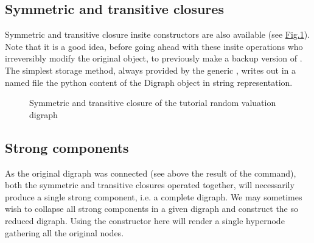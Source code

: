 \documentclass[a4paper,12pt,english]{sphinxhowto}
\let\sphinxpxdimen\pdfpxdimen\else\newdimen\sphinxpxdimen
\begin{document}
\subsection{Symmetric and transitive closures}
\label{\detokenize{tutorial:symmetric-and-transitive-closures}}
Symmetric and transitive closure in\sphinxhyphen{}site constructors are also available (see \hyperref[\detokenize{tutorial:strongcomponents}]{Fig.\@ \ref{\detokenize{tutorial:strongcomponents}}}). Note that it is a good idea, before going ahead with these in\sphinxhyphen{}site operations who irreversibly modify the original  object, to previously make a backup version of . The simplest storage method, always provided by the generic , writes out in a named file the python content of the Digraph object in string representation.

\begin{sphinxVerbatim}[commandchars=\\\{\},numbers=left,firstnumber=1,stepnumber=1]
\end{sphinxVerbatim}

\begin{figure}[H]
\centering
\capstart

\noindent\sphinxincludegraphics[width=300\sphinxpxdimen]{{strongComponents}.png}
\caption{Symmetric and transitive closure of the tutorial random valuation digraph}\label{\detokenize{tutorial:strongcomponents}}\end{figure}


\subsection{Strong components}
\label{\detokenize{tutorial:strong-components}}
As the original digraph  was connected (see above the result of the  command), both the symmetric and transitive closures operated together, will necessarily produce a single strong component, i.e. a complete digraph. We may sometimes wish to collapse all strong components in a given digraph and construct the so reduced digraph. Using the  constructor here will render a single hyper\sphinxhyphen{}node gathering all the original nodes.
\end{document}

